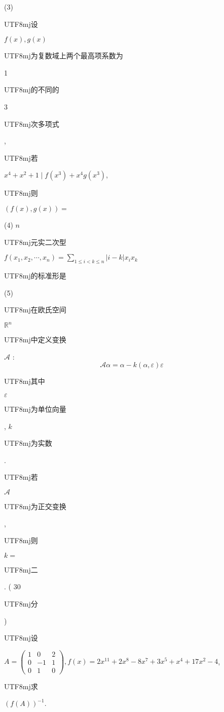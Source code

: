 \documentclass[10pt]{article}
\begin{document}
(3) \begin{CJK}{UTF8}{mj}设\end{CJK} $f(x), g(x)$ \begin{CJK}{UTF8}{mj}为复数域上两个最高项系数为\end{CJK} 1 \begin{CJK}{UTF8}{mj}的不同的\end{CJK} 3 \begin{CJK}{UTF8}{mj}次多项式\end{CJK}, \begin{CJK}{UTF8}{mj}若\end{CJK} $x^{4}+x^{2}+1 \mid f\left(x^{3}\right)+x^{4} g\left(x^{3}\right)$, \begin{CJK}{UTF8}{mj}则\end{CJK} $(f(x), g(x))=$

(4) $n$ \begin{CJK}{UTF8}{mj}元实二次型\end{CJK} $f\left(x_{1}, x_{2}, \cdots, x_{n}\right)=\sum_{1 \leqslant i<k \leqslant n}|i-k| x_{i} x_{k}$ \begin{CJK}{UTF8}{mj}的标准形是\end{CJK}

(5) \begin{CJK}{UTF8}{mj}在欧氏空间\end{CJK} $\mathbb{R}^{n}$ \begin{CJK}{UTF8}{mj}中定义变换\end{CJK} $\mathscr{A}$ :
$$
\mathscr{A} \alpha=\alpha-k(\alpha, \varepsilon) \varepsilon
$$
\begin{CJK}{UTF8}{mj}其中\end{CJK} $\varepsilon$ \begin{CJK}{UTF8}{mj}为单位向量\end{CJK}, $k$ \begin{CJK}{UTF8}{mj}为实数\end{CJK}. \begin{CJK}{UTF8}{mj}若\end{CJK} $\mathscr{A}$ \begin{CJK}{UTF8}{mj}为正交变换\end{CJK}, \begin{CJK}{UTF8}{mj}则\end{CJK} $k=$

\begin{CJK}{UTF8}{mj}二\end{CJK}. ( 30 \begin{CJK}{UTF8}{mj}分\end{CJK}) \begin{CJK}{UTF8}{mj}设\end{CJK} $A=\left(\begin{array}{ccc}1 & 0 & 2 \\ 0 & -1 & 1 \\ 0 & 1 & 0\end{array}\right), f(x)=2 x^{11}+2 x^{8}-8 x^{7}+3 x^{5}+x^{4}+17 x^{2}-4$, \begin{CJK}{UTF8}{mj}求\end{CJK} $(f(A))^{-1}$.
\end{document}

